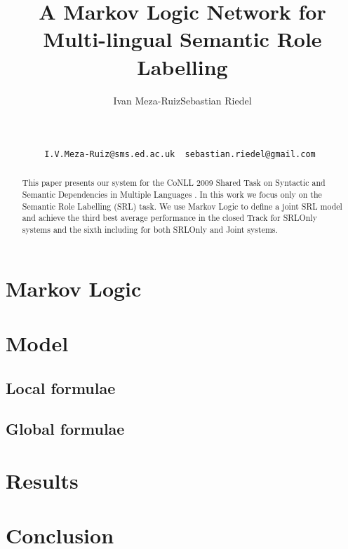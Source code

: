 \documentclass[11pt]{article}
\title{A Markov Logic Network for Multi-lingual Semantic Role Labelling}
\author{
Ivan Meza-Ruiz\footnotemark[1]  \qquad Sebastian Riedel\footnotemark[2] 
\footnotemark[3]   \\
\footnotemark[1]  {School of Informatics, University of Edinburgh, UK}\\
\footnotemark[2]  {Department of Computer Science, University of Tokyo, Japan}\\
\footnotemark[3]  {Database Center for Life Science, Research Organization of 
Information and System, Japan}\\
\footnotemark[1]  \tt  I.V.Meza-Ruiz@sms.ed.ac.uk \footnotemark[2] \tt 
sebastian.riedel@gmail.com
}
\date{}
\begin{document}
 



\maketitle
\begin{abstract}
This paper presents our system for the CoNLL 2009 Shared
Task on Syntactic and Semantic Dependencies in Multiple
Languages \citep{CoNLL-2009-ST}. In this work we focus only
on the Semantic Role Labelling (SRL) task. We use Markov Logic to define a joint SRL model and achieve
the third best average performance in the closed Track for SRLOnly systems and 
the sixth including for both SRLOnly and Joint systems.
\end{abstract}
\section{Markov Logic} \label{sec:markovlogic}



\section{Model} \label{sec:model} 


\subsection{Local formulae}\label{sec:local} 
 


\subsection{Global formulae}



\section{Results}\label{sec:results}






\section{Conclusion} \label{sec:conclusion}





\end{document}
